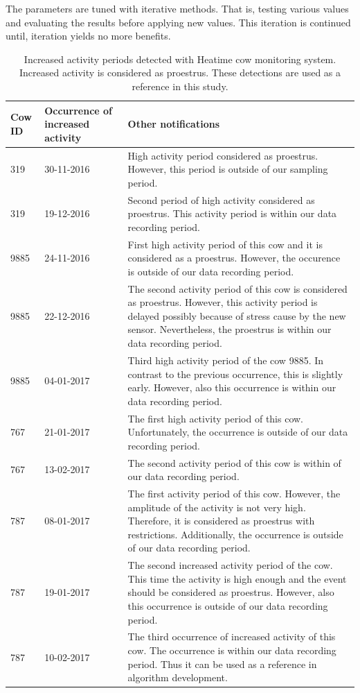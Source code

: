 \documentclass[english,12pt,a4paper,pdftex,elec,utf8]{aaltothesis}
\begin{document}
The parameters are tuned with iterative methods. That is, testing various values and evaluating the results before applying new values. This iteration is continued until, iteration yields no more benefits.


\begin{table} \caption{Increased activity periods detected with Heatime cow monitoring system. Increased activity is considered as proestrus. These detections are used as a reference in this study.}
\centering
\begin{tabular}{| p{1.25cm} | p{2.25cm} | p{8.8cm} |}
\hline
\textbf{Cow ID} & \textbf{Occurrence of increased activity} & \textbf{Other notifications} \\  \hline
319 & 30-11-2016 & High activity period considered as proestrus. However, this period is outside of our sampling period. \\ \hline
319 & 19-12-2016 &  Second period of high activity considered as proestrus. This activity period is within our data recording period.  \\ \hline
9885 & 24-11-2016 & First high activity period of this cow and it is considered as a proestrus. However, the occurence is outside of our data recording period.  \\ \hline
9885  & 22-12-2016  & The second activity period of this cow is considered as proestrus. However, this activity period is delayed possibly because of stress cause by the new sensor. Nevertheless, the proestrus is within our data recording period.  \\ \hline
9885  & 04-01-2017  & Third high activity period of the cow 9885. In contrast to the previous occurrence, this is slightly early. However, also this occurrence is within our data recording period.  \\ \hline
 767 &  21-01-2017 & The first high activity period of this cow. Unfortunately, the occurrence is outside of our data recording period.  \\ \hline
 767 & 13-02-2017  & The second activity period of this cow is within of our data recording period.  \\ \hline
 787 & 08-01-2017 &  The first activity period of this cow. However, the amplitude of the activity is not very high. Therefore, it is considered as proestrus with restrictions. Additionally, the occurrence is outside of our data recording period. \\ \hline
 787 & 19-01-2017  & The second increased activity period of the cow. This time the activity is high enough and the event should be considered as proestrus. However, also this occurrence is outside of our data recording period.  \\ \hline
 787 & 10-02-2017  &  The third occurrence of increased activity of this cow. The occurrence is within our data recording period. Thus it can be used as a reference in algorithm development. \\ \hline
\end{tabular}
\end{table}
\end{document}
